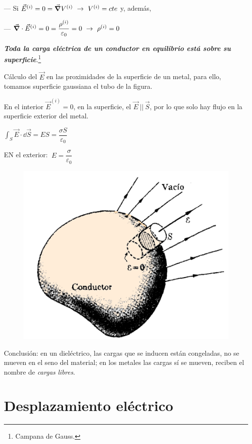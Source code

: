 --- Si $\vec E^{(i)}=0 =\vec \grad V^{(i)}\ \to \ V^{(i)}=cte$ y, además, 

--- $\vec \grad \cdot \vec E^{(i)}=0=\dfrac {\rho^{(i)}}{\varepsilon_0}=0 \ \to \ \rho^{(i)}=0$ 

\emph\textbf{{Toda la carga eléctrica de un conductor en equilibrio está sobre su superficie}}.\footnote{Campana de Gauss.}



\begin{multicols}{2}
Cálculo del $\vec E$ en las proximidades de la superficie de un metal, para ello, tomamos superficie gaussiana el tubo de la figura.

En el interior $\vec E^{(i)}=0$, en la superficie, el $\vec E \ || \ \vec S$, por lo que solo hay flujo en la superficie exterior del metal.

$\displaystyle \int_S \vec E \cdot \dd \vec S =ES=\dfrac{\sigma S}{\varepsilon_0}$

EN el exterior: $ \ E=\dfrac \sigma {\varepsilon_0}$

\begin{figure}[H]
	\centering
	\includegraphics[width=.55\textwidth]{imagenes/imagenes24/T24IM09.png}
\end{figure}
\end{multicols}
Conclusión: en un dieléctrico, las cargas que se inducen están congeladas, no se mueven en el seno del material; en los metales las cargas sí se mueven, reciben el nombre de \emph{cargas libres}.

\section{Desplazamiento eléctrico}

